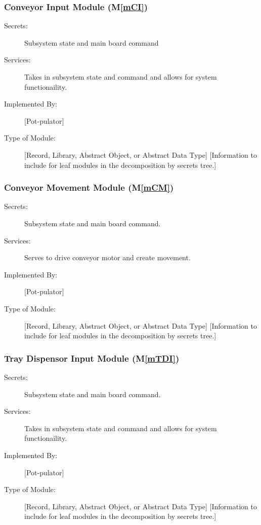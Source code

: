 \documentclass[12pt, titlepage]{article}
\newcommand{\mref}[1]{M\ref{#1}}
\begin{document}
\subsubsection{Conveyor Input Module (\mref{mCI})}
\begin{description}
\item[Secrets:] Subsystem state and main board command
\item[Services:] Takes in subsystem state and command and allows for system functionaility.
\item[Implemented By:] [Pot-pulator]
\item[Type of Module:] [Record, Library, Abstract Object, or Abstract Data Type]
  [Information to include for leaf modules in the decomposition by secrets tree.]
\end{description}


\subsubsection{Conveyor Movement Module (\mref{mCM})}
\begin{description}
\item[Secrets:] Subsystem state and main board command.
\item[Services:] Serves to drive conveyor motor and create movement.
\item[Implemented By:] [Pot-pulator]
\item[Type of Module:] [Record, Library, Abstract Object, or Abstract Data Type]
  [Information to include for leaf modules in the decomposition by secrets tree.]
\end{description}

\subsubsection{Tray Dispensor Input Module (\mref{mTDI})}
\begin{description}
\item[Secrets:] Subsystem state and main board command.
\item[Services:] Takes in subsystem state and command and allows for system functionaility.
\item[Implemented By:] [Pot-pulator]
\item[Type of Module:] [Record, Library, Abstract Object, or Abstract Data Type]
  [Information to include for leaf modules in the decomposition by secrets tree.]
\end{description}
\end{document}
